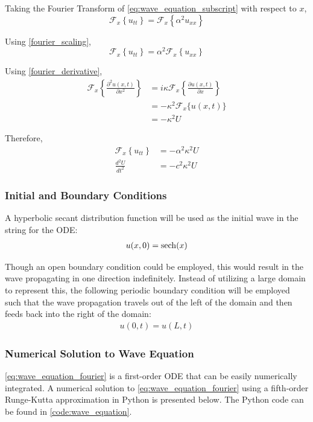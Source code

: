 \vspace{5mm}
\noindent
Taking the Fourier Transform of \cref{eq:wave_equation_subscript} with respect to \(x\),
\begin{equation}
    \mathcal{F}_x \left\{ u_{tt} \right\} = \mathcal{F}_x \left\{ \alpha^2 u_{xx} \right\}
\end{equation}

\noindent
Using \cref{fourier_scaling},
\begin{equation}
    \mathcal{F}_x \left\{ u_{tt} \right\} = \alpha^2 \mathcal{F}_x \left\{ u_{xx} \right\}
\end{equation}

\noindent
Using \cref{fourier_derivative},
\begin{align}
    \mathcal{F}_x \left\{ \frac{\partial^2 u(x, t)}{\partial x^2} \right\} & = i \kappa \mathcal{F}_x \left\{ \frac{\partial u(x, t)}{\partial x} \right\} \\
    & = -\kappa^2 \mathcal{F}_x \{ u(x, t) \} \\
    & = -\kappa^2 U
\end{align}

\noindent
Therefore,
\begin{align}
    \mathcal{F}_x \left\{ u_{tt} \right\} &= -\alpha^2 \kappa^2 U \\
    \frac{d^2 U}{dt^2} &= -c^2 \kappa^2 U \label{eq:wave_equation_fourier}
\end{align}

\subsubsection{Initial and Boundary Conditions}
\noindent
A hyperbolic secant distribution function will be used as the initial wave in the string for the ODE:
\begin{align}
    u(x, 0)=\operatorname{sech}(x) \label{eq:wave_equation_initial_condition}
\end{align}

\noindent
Though an open boundary condition could be employed, this would result in the wave propagating in one direction indefinitely. Instead of utilizing a large domain to represent this, the following periodic boundary condition will be employed such that the wave propagation travels out of the left of the domain and then feeds back into the right of the domain:
\begin{align}
    u(0, t) = u(L, t)
\end{align}

\subsubsection{Numerical Solution to Wave Equation}
\cref{eq:wave_equation_fourier} is a first-order ODE that can be easily numerically integrated. A numerical solution to \cref{eq:wave_equation_fourier} using a fifth-order Runge-Kutta approximation in Python is presented below. The Python code can be found in \cref{code:wave_equation}.

